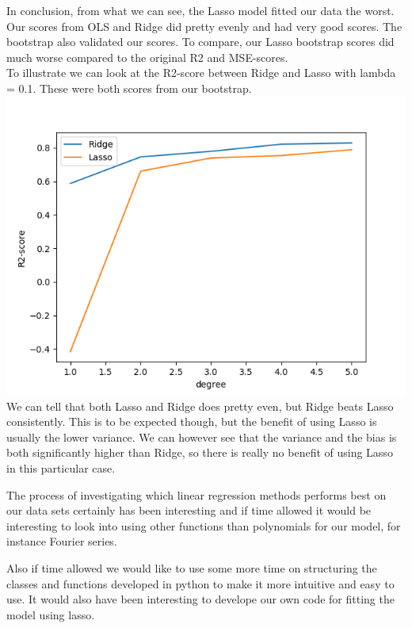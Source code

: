 \documentclass[a4paper,norsk]{article}
\begin{document}
\par
In conclusion, from what we can see, the Lasso model fitted our data the worst. Our scores from OLS and Ridge did pretty evenly and had very good scores. The bootstrap also validated our scores. To compare, our Lasso bootstrap scores did much worse compared to the original R2 and MSE-scores.
\\To illustrate we can look at the R2-score between Ridge and Lasso with lambda = 0.1. These were both scores from our bootstrap.
\\ \includegraphics[scale=.7]{R2realdata1e-1}
\\We can tell that both Lasso and Ridge does pretty even, but Ridge beats Lasso consistently. This is to be expected though, but the benefit of using Lasso is usually the lower variance. We can however see that the variance and the bias is both significantly higher than Ridge, so there is really no benefit of using Lasso in this particular case.
\par
The process of investigating which linear regression methods performs
best on our data sets certainly has been interesting 
and if time allowed it would be interesting to look into using 
other functions than polynomials for our model, 
for instance Fourier series.
\par
Also if time allowed we would like to use some more time on structuring 
the classes and functions developed in python to make it more 
intuitive and easy to use. It would also
have been interesting to develope our own code for fitting the model
using lasso.
{}

\end{document}

